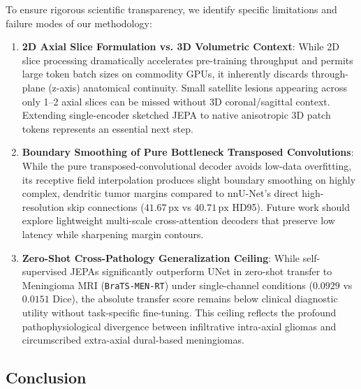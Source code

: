 \documentclass{article}
\begin{document}
To ensure rigorous scientific transparency, we identify specific limitations and failure modes of our methodology:
\begin{enumerate}
    \item \textbf{2D Axial Slice Formulation vs. 3D Volumetric Context}: While 2D slice processing dramatically accelerates pre-training throughput and permits large token batch sizes on commodity GPUs, it inherently discards through-plane (z-axis) anatomical continuity. Small satellite lesions appearing across only 1--2 axial slices can be missed without 3D coronal/sagittal context. Extending single-encoder sketched JEPA to native anisotropic 3D patch tokens represents an essential next step.
    \item \textbf{Boundary Smoothing of Pure Bottleneck Transposed Convolutions}: While the pure transposed-convolutional decoder avoids low-data overfitting, its receptive field interpolation produces slight boundary smoothing on highly complex, dendritic tumor margins compared to nnU-Net's direct high-resolution skip connections ($41.67\,\text{px}$ vs $40.71\,\text{px}$ HD95). Future work should explore lightweight multi-scale cross-attention decoders that preserve low latency while sharpening margin contours.
    \item \textbf{Zero-Shot Cross-Pathology Generalization Ceiling}: While self-supervised JEPAs significantly outperform UNet in zero-shot transfer to Meningioma MRI (\texttt{BraTS-MEN-RT}) under single-channel conditions ($0.0929$ vs $0.0151$ Dice), the absolute transfer score remains below clinical diagnostic utility without task-specific fine-tuning. This ceiling reflects the profound pathophysiological divergence between infiltrative intra-axial gliomas and circumscribed extra-axial dural-based meningiomas.
\end{enumerate}

\subsection{Conclusion}
\end{document}
